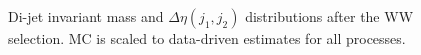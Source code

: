 \begin{figure}[!hbtp]
\centering
{}
\caption{Di-jet invariant mass  and $\Delta\eta(j_1, j_2)$  distributions after the 
WW selection. MC is scaled to data-driven estimates for all processes.}
\label{fig:ww_2j}
\end{figure}

